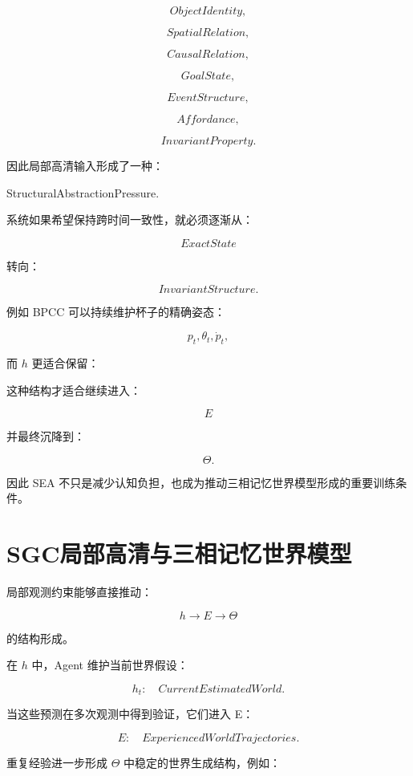 \[
ObjectIdentity,
\]

\[
SpatialRelation,
\]

\[
CausalRelation,
\]

\[
GoalState,
\]

\[
EventStructure,
\]

\[
Affordance,
\]

\[
InvariantProperty.
\]

因此局部高清输入形成了一种：

\begin{statementbox}
StructuralAbstractionPressure.
\end{statementbox}

系统如果希望保持跨时间一致性，就必须逐渐从：

\[
ExactState
\]

转向：

\[
InvariantStructure.
\]

例如 BPCC 可以持续维护杯子的精确姿态：

\[
p_t,\theta_t,\dot p_t,
\]

而 $h$ 更适合保留：

\begin{statementbox}
\centering
{}
\end{statementbox}

这种结构才适合继续进入：

\[
E
\]

并最终沉降到：

\[
\Theta.
\]

因此 SEA 不只是减少认知负担，也成为推动三相记忆世界模型形成的重要训练条件。

\section{SGC局部高清与三相记忆世界模型}

局部观测约束能够直接推动：

\[
h
\rightarrow
E
\rightarrow
\Theta
\]

的结构形成。

在 $h$ 中，Agent 维护当前世界假设：

\[
h_t:
\quad
CurrentEstimatedWorld.
\]

当这些预测在多次观测中得到验证，它们进入 E：

\[
E:
\quad
ExperiencedWorldTrajectories.
\]

重复经验进一步形成 $\Theta$ 中稳定的世界生成结构，例如：

